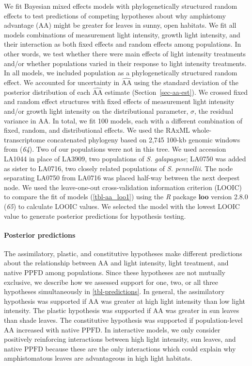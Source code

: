 \documentclass[
  letterpaper,
  DIV=11,
  numbers=noendperiod]{scrartcl}
\let\oldparagraph\paragraph
\renewcommand{\paragraph}[1]{\oldparagraph{#1}\mbox{}}
\newcommand{\aax}{$\mathrm{AA}$}
\newcommand{\ppfd}{$\mathrm{PPFD}$}
\begin{document}
We fit Bayesian mixed effects models with phylogenetically structured
random effects to test predictions of competing hypotheses about why
amphistomy advantage (\aax) might be greater for leaves in sunny, open
habitats. We fit all models combinations of measurement light intensity,
growth light intensity, and their interaction as both fixed effects and
random effects among populations. In other words, we test whether there
were main effects of light intensity treatments and/or whether
populations varied in their response to light intensity treatments. In
all models, we included population as a phylogenetically structured
random effect. We accounted for uncertainty in \(\widehat{\mathrm{AA}}\)
using the standard deviation of the posterior distribution of each
\(\widehat{\mathrm{AA}}\) estimate (Section~\ref{sec-aa-est}). We
crossed fixed and random effect structures with fixed effects of
measurement light intensity and/or growth light intensity on the
distributional parameter, \(\sigma\), the residual variance in \aax{}.
In total, we fit 100 models, each with a different combination of fixed,
random, and distributional effects. We used the RAxML
whole-transcriptome concatenated phylogeny based on 2,745 100-kb genomic
windows from (\emph{64}). Two of our populations were not in this tree.
We used accession LA1044 in place of LA3909, two populations of \emph{S.
galapagnse}; LA0750 was added as sister to LA0716, two closely related
populations of \emph{S. pennellii}. The node separating LA0750 from
LA0716 was placed half-way between the next deepest node. We used the
leave-one-out cross-validation information criterion (LOOIC) to compare
the fit of models (\autoref{tbl-aa_loo1}) using the \emph{R} package
\textbf{loo} version 2.8.0 (\emph{65}) to calculate LOOIC values. We
selected the model with the lowest LOOIC value to generate posterior
predictions for hypothesis testing.

\paragraph{Posterior predictions}\label{sec-predictions}

The assimilatory, plastic, and constitutive hypotheses make different
predictions about the relationship between \aax{} and light intensity,
light treatment, and native \ppfd{} among populations. Since these
hypotheses are not mutually exclusive, we describe how we assessed
support for one, two, or all three hypotheses simultaneously in
\autoref{tbl-predictions}. In general, the assimilatory hypothesis was
supported if \aax{} was greater at high light intensity than low light
intensity. The plastic hypothesis was supported if \aax{} was greater in
sun leaves than shade leaves. The constitutive hypothesis was supported
if population-level \aax{} increased with native \ppfd. In interactive
models, we only consider positively reinforcing interactions between
high light intensity, sun leaves, and native \ppfd{} because these are
the only interactions which could explain why amphistomatous leaves are
advantageous in high light habitats.
\end{document}
